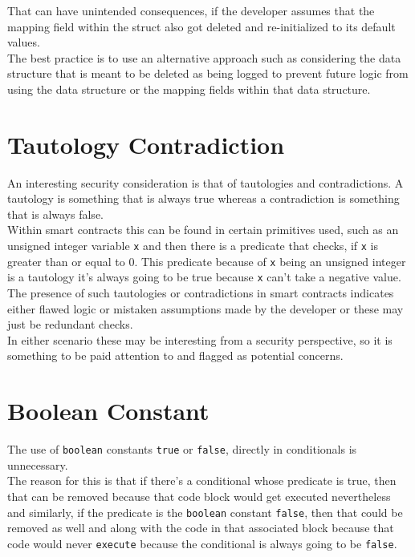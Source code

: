 That can have unintended consequences, if the developer assumes that the mapping field within the struct also got deleted and re-initialized to its default values.\\

The best practice is to use an alternative approach such as considering the data structure that is meant to be deleted as being logged to prevent future logic from using the data structure or the mapping fields within that data structure.

\section{Tautology Contradiction}

An interesting security consideration is that of tautologies and contradictions. A tautology is something that is always true whereas a contradiction is something that is always false.\\

Within smart contracts this can be found in certain primitives used, such as an unsigned integer variable \texttt{x} and then there is a predicate that checks, if \texttt{x} is greater than or equal to 0. This predicate because of \texttt{x} being an unsigned integer is a tautology it's always going to be true because \texttt{x} can't take a negative value.\\

The presence of such tautologies or contradictions in smart contracts indicates either flawed logic or mistaken assumptions made by the developer or these may just be redundant checks.\\

In either scenario these may be interesting from a security perspective, so it is something to be paid attention to and flagged as potential concerns.

\section{Boolean Constant}

The use of \texttt{boolean} constants \texttt{true} or \texttt{false}, directly in conditionals is unnecessary. \\

The reason for this is that if there's a conditional whose predicate is true, then that can be removed because that code block would get executed nevertheless and similarly, if the predicate is the \texttt{boolean} constant \texttt{false}, then that could be removed as well and along with the code in that associated block because that code would never \texttt{execute} because the conditional is always going to be \texttt{false}.\\

